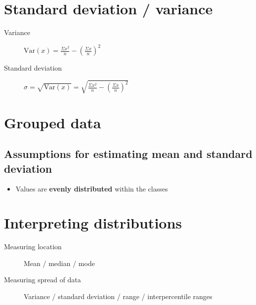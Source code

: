 \section{Standard deviation / variance}
\begin{description}
    \item[Variance] $\mathrm{Var}(x)=\frac{\Sigma x^2}{n} - (\frac{\Sigma x}{n})^2$
    \item[Standard deviation] $\sigma=\sqrt{\mathrm{Var}(x)}=\sqrt{\frac{\Sigma x^2}{n} - (\frac{\Sigma x}{n})^2}$
\end{description}

\section{Grouped data}
\subsection{Assumptions for estimating mean and standard deviation}
\begin{itemize}
    \item Values are \textbf{evenly distributed} within the classes
\end{itemize}

\section{Interpreting distributions}
\begin{description}
    \item[Measuring location] Mean / median / mode
    \item[Measuring spread of data] Variance / standard deviation / range / interpercentile ranges
\end{description}
